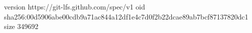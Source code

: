 version https://git-lfs.github.com/spec/v1
oid sha256:00d5906abe00cdb9a71ac844a12df1e4c7d0f2b22dcae89ab7bcf87137820dc1
size 349692
